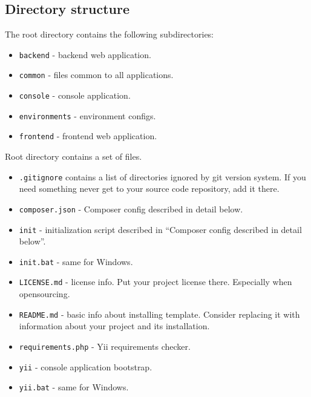 \subsection{Directory structure}
The root directory contains the following subdirectories:

\begin{itemize}
\item \lstinline|backend| - backend web application.
\item \lstinline|common| - files common to all applications.
\item \lstinline|console| - console application.
\item \lstinline|environments| - environment configs.
\item \lstinline|frontend| - frontend web application.
\end{itemize}
Root directory contains a set of files.

\begin{itemize}
\item \lstinline|.gitignore| contains a list of directories ignored by git version system. If you need something never get to your source
code repository, add it there.
\item \lstinline|composer.json| - Composer config described in detail below.
\item \lstinline|init| - initialization script described in ``Composer config described in detail below''.
\item \lstinline|init.bat| - same for Windows.
\item \lstinline|LICENSE.md| - license info. Put your project license there. Especially when opensourcing.
\item \lstinline|README.md| - basic info about installing template. Consider replacing it with information about your project and its
installation.
\item \lstinline|requirements.php| - Yii requirements checker.
\item \lstinline|yii| - console application bootstrap.
\item \lstinline|yii.bat| - same for Windows.
\end{itemize}

